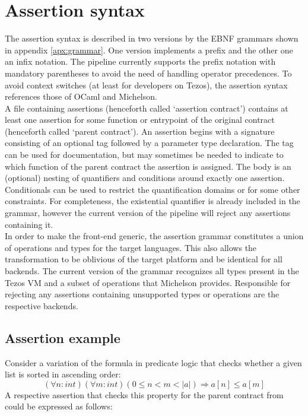 \section{Assertion syntax}
The assertion syntax is described in two versions by the EBNF grammars shown in appendix \ref{apx:grammar}. One version implements a prefix and the other one an infix notation. The pipeline currently supports the prefix notation with mandatory parentheses to avoid the need of handling operator precedences. To avoid context switches (at least for developers on Tezos), the assertion syntax references those of OCaml and Michelson.\\
A file containing assertions (henceforth called `assertion contract') contains at least one assertion for some function or entrypoint of the original contract (henceforth called `parent contract'). An assertion begins with a signature consisting of an optional tag followed by a parameter type declaration. The tag can be used for documentation, but may sometimes be needed to indicate to which function of the parent contract the assertion is assigned. The body is an (optional) nesting of quantifiers and conditions around exactly one assertion. Conditionals can be used to restrict the quantification domains or for some other constraints. For completeness, the existential quantifier is already included in the grammar, however the current version of the pipeline will reject any assertions containing it.\\
In order to make the front-end generic, the assertion grammar constitutes a union of operations and types for the target languages. This also allows the transformation to be oblivious of the target platform and be identical for all backends. The current version of the grammar recognizes all types present in the Tezos VM and a subset of operations that Michelson provides. Responsible for rejecting any assertions containing unsupported types or operations are the respective backends.

\subsection{Assertion example}
Consider a variation of the formula in predicate logic that checks whether a given list is sorted in ascending order:
\begin{equation}\label{eq:sorted_v2}
	(\forall n : int)(\forall m : int) (0 \leq n < m < |a|) \Rightarrow a[n] \leq a[m]
\end{equation}
A respective assertion that checks this property for the parent contract from  could be expressed as follows:


